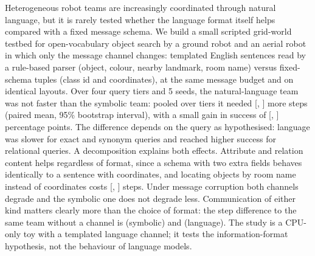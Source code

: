 Heterogeneous robot teams are increasingly coordinated through natural language, but it is rarely tested whether the language format itself helps compared with a fixed message schema. We build a small scripted grid-world testbed for open-vocabulary object search by a ground robot and an aerial robot in which only the message channel changes: templated English sentences read by a rule-based parser (object, colour, nearby landmark, room name) versus fixed-schema tuples (class id and coordinates), at the same message budget and on identical layouts. Over four query tiers and 5 seeds, the natural-language team was not faster than the symbolic team: pooled over tiers it needed  [, ] more steps (paired mean, 95\% bootstrap interval), with a small gain in success of  [, ] percentage points. The difference depends on the query as hypothesised: language was slower for exact and synonym queries and reached higher success for relational queries. A decomposition explains both effects. Attribute and relation content helps regardless of format, since a schema with two extra fields behaves identically to a sentence with coordinates, and locating objects by room name instead of coordinates costs  [, ] steps. Under message corruption both channels degrade and the symbolic one does not degrade less. Communication of either kind matters clearly more than the choice of format: the step difference to the same team without a channel is  (symbolic) and  (language). The study is a CPU-only toy with a templated language channel; it tests the information-format hypothesis, not the behaviour of language models.
